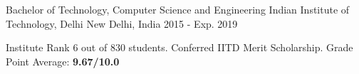 

\begin{cventries}

  \cventry
    {Bachelor of Technology, Computer Science and Engineering} %
    {Indian Institute of Technology, Delhi} %
    {New Delhi, India} %
    {2015 - Exp. 2019} %
    {
      \begin{cvitems} %
        \item {Institute Rank 6 out of 830 students. Conferred IITD Merit Scholarship. Grade Point Average: \textbf{9.67/10.0}}
      \end{cvitems}
    }

\end{cventries}
